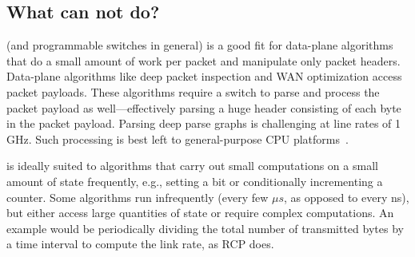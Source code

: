 \subsection{What can \absmachine not do?}
\label{ss:limitations}

\absmachine (and programmable switches in general) is a good fit for data-plane
algorithms that do a small amount of work per packet and manipulate only packet
headers. Data-plane algorithms like deep packet inspection and WAN optimization
access packet payloads. These algorithms require a switch to parse and process
the packet payload as well---effectively parsing a huge header consisting of
each byte in the packet payload. Parsing deep parse graphs is challenging at
line rates of 1 GHz. Such processing is best left to general-purpose CPU
platforms~\cite{e2, aplomb}.

\absmachine is ideally suited to algorithms that carry out small computations
on a small amount of state frequently, e.g., setting a bit or conditionally
incrementing a counter. Some algorithms run infrequently (every few $\mu s$, as
opposed to every ns), but either access large quantities of state or require
complex computations. An example would be periodically dividing the total
number of transmitted bytes by a time interval to compute the link rate, as RCP
does.
